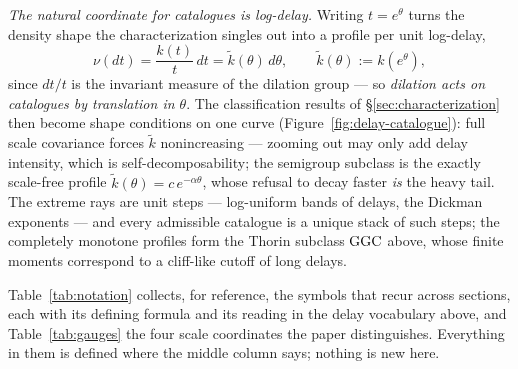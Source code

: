 \begin{remark}
\emph{The natural coordinate for catalogues is log-delay.} Writing $t = e^\theta$
turns the density shape the characterization singles out into a profile per unit
log-delay,
\[
  \nu(dt) = \frac{k(t)}{t}\,dt = \tilde k(\theta)\,d\theta,
  \qquad \tilde k(\theta) := k(e^\theta),
\]
since $dt/t$ is the invariant measure of the dilation group --- so \emph{dilation
acts on catalogues by translation in $\theta$}. The classification results of
\S\ref{sec:characterization} then become shape conditions on one curve
(Figure~\ref{fig:delay-catalogue}): full scale covariance forces $\tilde k$
nonincreasing --- zooming out may only add delay intensity, which is
self-decomposability; the semigroup subclass is the exactly scale-free profile
$\tilde k(\theta) = c\,e^{-\alpha\theta}$, whose refusal to decay faster
\emph{is} the heavy tail. The extreme rays are unit steps --- log-uniform bands
of delays, the Dickman exponents --- and every admissible catalogue is a unique
stack of such steps; the completely monotone profiles form the Thorin subclass
$\mathrm{GGC}$ above, whose finite moments correspond to a cliff-like cutoff of long
delays.
\end{remark}



Table~\ref{tab:notation} collects, for reference, the symbols that recur across sections,
each with its defining formula and its reading in the delay vocabulary above, and
Table~\ref{tab:gauges} the four scale coordinates the paper distinguishes. Everything in
them is defined where the middle column says; nothing is new here.

